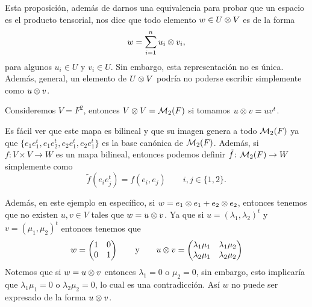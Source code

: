 Esta proposición, además de darnos una equivalencia para probar que un espacio es el producto tensorial, nos dice que todo elemento $w \in U \otimes V$ es de la forma
\[
  w = \sum_{i=1}^n u_i \otimes v_i,
\]
para algunos $u_i \in U$ y $v_i \in U$. Sin embargo, esta representación no es única. Además, general, un elemento de $U \otimes V$ podría no poderse escribir simplemente como $u \otimes v$.

\begin{example}
  Consideremos $V = F^2$, entonces $V \otimes V = \mathcal{M}_2(F)$ si tomamos $u \otimes v = uv^t$. 

  Es fácil ver que este mapa es bilineal y que su imagen genera a todo $\mathcal{M}_2(F)$ ya que $\{e_1 e_1^t, e_1 e_2^t, e_2 e_1^t, e_2 e_1^t\}$ es la base canónica de $\mathcal{M}_2(F)$. Además, si $f\colon V \times V \to W$ es un mapa bilineal, entonces podemos definir $\tilde f \colon \mathcal{M}_2(F) \to W$ simplemente como
  \[
    \tilde f ( e_i e_j^t) = f(e_i, e_j)   \qquad i,j \in \{ 1,2\}.
  \]
  

  Además, en este ejemplo en específico, si $w = e_1 \otimes e_1 + e_2 \otimes e_2$, entonces tenemos que no existen $u,v \in V$ tales que $w = u \otimes v $. Ya que si $u = (\lambda_1, \lambda_2)^t$ y $v = (\mu_1, \mu_2)^t$ entonces tenemos que
  \[
    w = \begin{pmatrix}1 & 0 \\ 0 & 1\end{pmatrix} 
    \qquad\text{y}\qquad
    u \otimes v = 
      \begin{pmatrix}
        \lambda_1 \mu_1 & \lambda_1 \mu_2 \\
        \lambda_2 \mu_1 & \lambda_2 \mu_2
      \end{pmatrix}
  \]
  Notemos que si $w = u \otimes v$ entonces $\lambda_1 = 0$ o $\mu_2 = 0$, sin embargo, esto implicaría que $\lambda_1\mu_1 = 0$ o $\lambda_2\mu_2 = 0$, lo cual es una contradicción. Así $w$ no puede ser expresado de la forma $u \otimes v$.
\end{example}